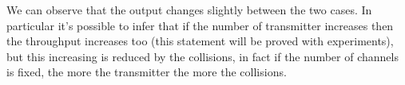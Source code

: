\noindent We can observe that the output changes slightly between the two cases. In particular it's possible to infer that if the number of transmitter increases then the throughput increases too (this statement will be proved with experiments), but this increasing is reduced by the collisions, in fact if the number of channels is fixed, the more the transmitter the more the collisions.

\noindent %

\noindent %




